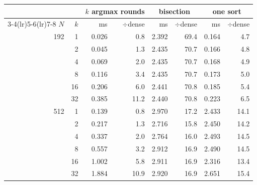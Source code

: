 \begin{tabular}{rr rr rr rr}
\toprule
& & \multicolumn{2}{c}{\textbf{$k$ argmax rounds}}
& \multicolumn{2}{c}{\textbf{bisection}}
& \multicolumn{2}{c}{\textbf{one sort}} \\
\cmidrule(lr){3-4}\cmidrule(lr){5-6}\cmidrule(lr){7-8}
$N$ & $k$ & ms & $\div$dense & ms & $\div$dense & ms & $\div$dense \\
\midrule
192 & 1 & 0.026 & 0.8 & 2.392 & 69.4 & 0.164 & 4.7 \\
 & 2 & 0.045 & 1.3 & 2.435 & 70.7 & 0.166 & 4.8 \\
 & 4 & 0.069 & 2.0 & 2.435 & 70.7 & 0.168 & 4.9 \\
 & 8 & 0.116 & 3.4 & 2.435 & 70.7 & 0.173 & 5.0 \\
 & 16 & 0.206 & 6.0 & 2.441 & 70.8 & 0.185 & 5.4 \\
 & 32 & 0.385 & 11.2 & 2.440 & 70.8 & 0.223 & 6.5 \\
\midrule
512 & 1 & 0.139 & 0.8 & 2.970 & 17.2 & 2.433 & 14.1 \\
 & 2 & 0.217 & 1.3 & 2.716 & 15.8 & 2.450 & 14.2 \\
 & 4 & 0.337 & 2.0 & 2.764 & 16.0 & 2.493 & 14.5 \\
 & 8 & 0.557 & 3.2 & 2.912 & 16.9 & 2.490 & 14.5 \\
 & 16 & 1.002 & 5.8 & 2.911 & 16.9 & 2.316 & 13.4 \\
 & 32 & 1.884 & 10.9 & 2.920 & 16.9 & 2.651 & 15.4 \\
\bottomrule
\end{tabular}%
